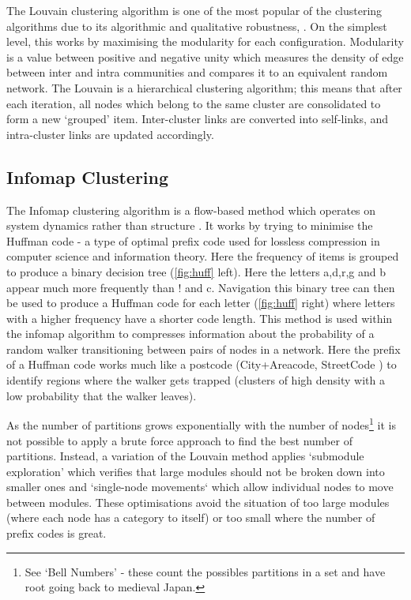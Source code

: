 The Louvain clustering algorithm is one of the most popular of the clustering algorithms due to its algorithmic and qualitative robustness, \citep{loudvain,loudrobust}. On the simplest level, this works by maximising the modularity for each configuration. Modularity is a value between positive and negative unity which measures the density of edge between inter and intra communities and compares it to an equivalent random network.
The Louvain is a hierarchical clustering algorithm; this means that after each iteration, all nodes which belong to the same cluster are consolidated to form a new `grouped' item. Inter-cluster links are converted into self-links, and intra-cluster links are updated accordingly.


\subsection{Infomap Clustering }


The Infomap clustering algorithm is a flow-based method which operates on system dynamics rather than structure \citep{mapeqn}. It works by trying to minimise the Huffman code \citep{huffman} - a type of optimal prefix code used for lossless compression in computer science and information theory.
Here the frequency of items is grouped to produce a binary decision tree (\autoref{fig:huff} left). Here the letters a,d,r,g and b appear much more frequently than ! and c. Navigation this binary tree can then be used to produce a Huffman code for each letter (\autoref{fig:huff} right) where letters with a higher frequency have a shorter code length. This method is used within the infomap algorithm to compresses information about the probability of a random walker transitioning between pairs of nodes in a network. Here the prefix of a Huffman code works much like a postcode (City+Areacode, StreetCode ) to identify regions where the walker gets trapped (clusters of high density with a low probability that the walker leaves).

As the number of partitions grows exponentially with the number of nodes\footnote{See `Bell Numbers' - these count the possibles partitions in a set and have root going back to medieval Japan.} it is not possible to apply a brute force approach to find the best number of partitions. Instead, a variation of the Louvain method applies `submodule exploration' which verifies that large modules should not be broken down into smaller ones and `single-node movements` which allow individual nodes to move between modules. These optimisations avoid the situation of too large modules (where each node has a category to itself) or too small where the number of prefix codes is great.


